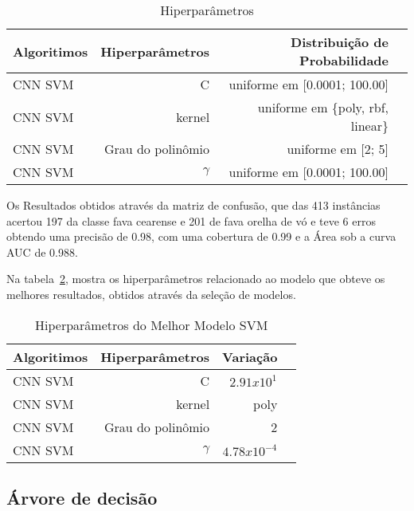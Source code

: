 \begin{table}[H]
\centering
\caption{Hiperparâmetros}
\label{tabela:hiperparametros_svm}
\def\arraystretch{1.2}
\begin{tabular}{@{}lrrr@{}}
\toprule
{\textbf{Algoritimos}} & {\textbf{Hiperparâmetros}} & {\textbf{Distribuição de Probabilidade}}  \\
\midrule
CNN SVM & C &  uniforme em [0.0001; 100.00] \\ 
CNN SVM & kernel &  uniforme em \{poly, rbf, linear\} \\ 
CNN SVM & Grau do polinômio & uniforme em [2; 5] \\ 
CNN SVM & $\gamma$ & uniforme em [0.0001; 100.00] \\ 
\bottomrule
\end{tabular}
\end{table}

Os Resultados obtidos através da matriz de confusão, que das 413 instâncias acertou 197 da classe fava cearense e 201 de fava orelha de vó e teve 6 erros obtendo uma precisão de 0.98, com uma cobertura de 0.99 e a Área sob a curva AUC de 0.988.

Na tabela~\ref{tabela:hiperparametros_best_models_svm_}, mostra os hiperparâmetros relacionado ao modelo que obteve os melhores resultados, obtidos através da seleção de modelos.

\begin{table}[H]
\centering
\caption{Hiperparâmetros do Melhor Modelo SVM}
\label{tabela:hiperparametros_best_models_svm_}
\def\arraystretch{1.2}
\begin{tabular}{@{}lrrr@{}}
\toprule
{\textbf{Algoritimos}} & {\textbf{Hiperparâmetros}} & {\textbf{Variação}}  \\
\midrule
CNN SVM & C & $2.91x10^{1}$ \\ %
CNN SVM & kernel & poly \\ 
CNN SVM & Grau do polinômio & 2 \\ 
CNN SVM & $\gamma$  & 
 $4.78x10^{-4}$ \\
\bottomrule
\end{tabular}
\end{table}

\subsection{Árvore de decisão}

